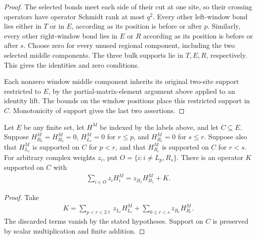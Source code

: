 \begin{proof}\leanok
    The selected bonds meet each side of their cut at one site, so their
    crossing operators have operator Schmidt rank at most $q^2$.
    Every other left-window bond lies either in $T$ or in $E$, according as
    its position is before or after $p$. Similarly, every other right-window
    bond lies in $E$ or $R$ according as its position is before or after $s$.
    Choose zero for every unused regional component, including the two selected
    middle components. The three bulk supports lie in $T,E,R$, respectively.
    This gives the identities and zero conditions.

    Each nonzero window middle component inherits its original two-site support
    restricted to $E$, by the partial-matrix-element argument above applied to
    an identity lift. The bounds on the window positions place this restricted
    support in $C$. Monotonicity of support gives the last two assertions.
\end{proof}

\begin{lemma}
    \label{thm:three_region_weighted_middle_remainder}
    \leanok
    Let $E$ be any finite set, let $H^M$ be indexed by the labels above, and
    let $C\subseteq E$. Suppose $H^M_{B_0}=H^M_{B_2}=0$,
    $H^M_{L_r}=0$ for $r\le p$, and $H^M_{R_r}=0$ for $s\le r$.
    Suppose also that $H^M_{L_r}$ is supported on $C$ for $p<r$, and that
    $H^M_{R_r}$ is supported on $C$ for $r<s$.
    For arbitrary complex weights $z_i$, put
    $O=\{i:i\ne L_p,R_s\}$. There is an operator $K$ supported on $C$ with
    \begin{align}
        \sum_{i\in O}z_iH_i^M=z_{B_1}H^M_{B_1}+K.
        \label{eq:three_region_weighted_middle_remainder}
    \end{align}
\end{lemma}
\begin{proof}\leanok
    Take
    \begin{align}
        K=\sum_{p<r<2\ell}z_{L_r}H^M_{L_r}
        +\sum_{0\le r<s}z_{R_r}H^M_{R_r}.
        \label{eq:three_region_weighted_remainder_formula}
    \end{align}
    The discarded terms vanish by the stated hypotheses. Support on $C$ is
    preserved by scalar multiplication and finite addition.
\end{proof}
